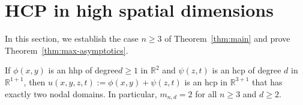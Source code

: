 \documentclass[AHL,Unicode,longabstracts,published]{cedram}
\newcommand{\R}{\mathbb{R}}
\newcommand{\R}{\mathbb{R}}
\begin{document}
\section{HCP in high spatial dimensions}\label{sec:high_dim}

In this section, we establish the case $n\geq 3$ of Theorem~\ref{thm:main} and prove Theorem~\ref{thm:max-asymptotics}.

\begin{prop} \label{prop:high_dim}
If $\phi(x,y)$ is an hhp of degree\linebreak $d\geq 1$ in $\R^{2}$ and $\psi(z,t)$ is an hcp of degree $d$ in $\R^{1+1}$, then $u(x,y,z,t):=\phi(x,y)+\psi(z,t)$ is an hcp in $\R^{3+1}$ that has exactly two nodal domains. In particular, $m_{n,d}=2$ for all $n\geq 3$ and $d\geq 2$.
\end{prop}
\end{document}
